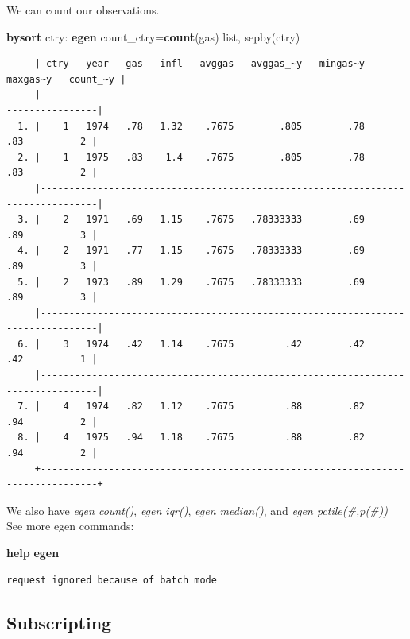 \documentclass[
]{book}
\newenvironment{Shaded}{\begin{snugshade}}{\end{snugshade}}
\newcommand{\FunctionTok}[1]{\textcolor[rgb]{0.13,0.29,0.53}{\textbf{#1}}}
\newcommand{\KeywordTok}[1]{\textcolor[rgb]{0.13,0.29,0.53}{\textbf{#1}}}
\newcommand{\NormalTok}[1]{#1}
\newcommand{\OtherTok}[1]{\textcolor[rgb]{0.56,0.35,0.01}{#1}}
\begin{document}
We can count our observations.

\begin{Shaded}
\begin{Highlighting}[]
\KeywordTok{bysort}\NormalTok{ ctry: }\KeywordTok{egen}\NormalTok{ count\_ctry=}\FunctionTok{count}\NormalTok{(gas)}
\OtherTok{list}\NormalTok{, sepby(ctry)}
\end{Highlighting}
\end{Shaded}

\begin{verbatim}
     | ctry   year   gas   infl   avggas   avggas_~y   mingas~y   maxgas~y   count_~y |
     |--------------------------------------------------------------------------------|
  1. |    1   1974   .78   1.32    .7675        .805        .78        .83          2 |
  2. |    1   1975   .83    1.4    .7675        .805        .78        .83          2 |
     |--------------------------------------------------------------------------------|
  3. |    2   1971   .69   1.15    .7675   .78333333        .69        .89          3 |
  4. |    2   1971   .77   1.15    .7675   .78333333        .69        .89          3 |
  5. |    2   1973   .89   1.29    .7675   .78333333        .69        .89          3 |
     |--------------------------------------------------------------------------------|
  6. |    3   1974   .42   1.14    .7675         .42        .42        .42          1 |
     |--------------------------------------------------------------------------------|
  7. |    4   1974   .82   1.12    .7675         .88        .82        .94          2 |
  8. |    4   1975   .94   1.18    .7675         .88        .82        .94          2 |
     +--------------------------------------------------------------------------------+
\end{verbatim}

We also have \emph{egen count()}, \emph{egen iqr()}, \emph{egen median()}, and \emph{egen pctile(\#,p(\#))}
See more egen commands:

\begin{Shaded}
\begin{Highlighting}[]
\KeywordTok{help} \KeywordTok{egen}
\end{Highlighting}
\end{Shaded}

\begin{verbatim}
request ignored because of batch mode
\end{verbatim}

\subsection{Subscripting}\label{subscripting}
\end{document}
